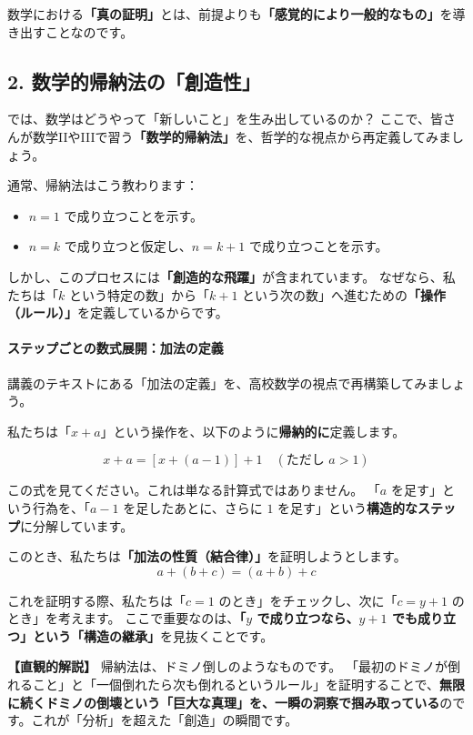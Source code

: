 \documentclass[a4paper,11pt,openany]{ltjsbook}
\begin{document}
\begin{lecturebox}
数学における\textbf{「真の証明」}とは、前提よりも\textbf{「感覚的により一般的なもの」}を導き出すことなのです。

\subsection*{2. 数学的帰納法の「創造性」}

では、数学はどうやって「新しいこと」を生み出しているのか？
ここで、皆さんが数学IIやIIIで習う\textbf{「数学的帰納法」}を、哲学的な視点から再定義してみましょう。

通常、帰納法はこう教わります：
\begin{itemize}[leftmargin=2em]
\item $n=1$ で成り立つことを示す。
\item $n=k$ で成り立つと仮定し、$n=k+1$ で成り立つことを示す。
\end{itemize}

しかし、このプロセスには\textbf{「創造的な飛躍」}が含まれています。
なぜなら、私たちは「$k$ という特定の数」から「$k+1$ という次の数」へ進むための\textbf{「操作（ルール）」}を定義しているからです。

\paragraph{ステップごとの数式展開：加法の定義}
講義のテキストにある「加法の定義」を、高校数学の視点で再構築してみましょう。

私たちは「$x+a$」という操作を、以下のように\textbf{帰納的に}定義します。

$$x + a = [x + (a - 1)] + 1 \quad (\text{ただし } a > 1)$$

この式を見てください。これは単なる計算式ではありません。
「$a$ を足す」という行為を、「$a-1$ を足したあとに、さらに $1$ を足す」という\textbf{構造的なステップ}に分解しています。

このとき、私たちは\textbf{「加法の性質（結合律）」}を証明しようとします。
$$a + (b + c) = (a + b) + c$$

これを証明する際、私たちは「$c=1$ のとき」をチェックし、次に「$c=y+1$ のとき」を考えます。
ここで重要なのは、\textbf{「$y$ で成り立つなら、$y+1$ でも成り立つ」という「構造の継承」}を見抜くことです。

\textbf{【直観的解説】}
帰納法は、ドミノ倒しのようなものです。
「最初のドミノが倒れること」と「一個倒れたら次も倒れるというルール」を証明することで、\textbf{無限に続くドミノの倒壊という「巨大な真理」を、一瞬の洞察で掴み取っている}のです。これが「分析」を超えた「創造」の瞬間です。


\end{lecturebox}
\end{document}
